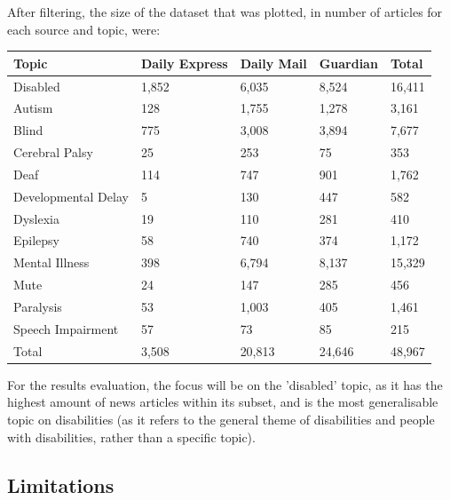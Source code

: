 \documentclass{report}
\begin{document}
After filtering, the size of the dataset that was plotted, in number of articles for each source and topic,  were:

\begin{center}
	\begin{tabu} to 1.0\textwidth { | X[c] | X[c] | X[c] | X[c] | X[c] | }
		\hline
		Topic & Daily Express & Daily Mail & Guardian & Total \\
		\hline
		Disabled & 1,852 & 6,035 & 8,524 & 16,411  \\
		\hline
		Autism & 128 & 1,755 & 1,278 & 3,161  \\
		\hline
		Blind & 775 & 3,008 & 3,894 & 7,677  \\
		\hline
		Cerebral Palsy & 25 & 253 & 75 & 353  \\
		\hline
		Deaf & 114 & 747 & 901 & 1,762  \\
		\hline
		Developmental Delay & 5 & 130 & 447 & 582  \\
		\hline
		Dyslexia & 19 & 110 & 281 & 410  \\
		\hline
		Epilepsy & 58 & 740 & 374 & 1,172  \\
		\hline
		Mental Illness & 398 & 6,794 & 8,137 & 15,329  \\
		\hline
		Mute & 24 & 147 & 285 & 456  \\
		\hline
		Paralysis & 53 & 1,003 & 405 & 1,461  \\
		\hline
		Speech Impairment & 57 & 73 & 85 & 215  \\
		\hline
		Total & 3,508 & 20,813 & 24,646 & 48,967  \\ 
		\hline
	\end{tabu}
\end{center}

For the results evaluation, the focus will be on the 'disabled' topic, as it has the highest amount of news articles within its subset, and is the most generalisable topic on disabilities (as it refers to the general theme of disabilities and people with disabilities, rather than a specific topic).

\subsection{Limitations} \label{limitations}
\end{document}
